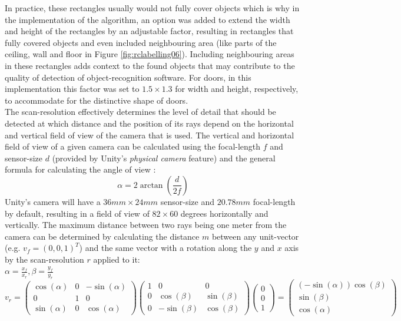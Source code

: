 In practice, these rectangles usually would not fully cover objects which is why in the implementation of the algorithm, an option was added to extend the width and height of the rectangles by an adjustable factor, resulting in rectangles that fully covered objects and even included neighbouring area (like parts of the ceiling, wall and floor in Figure \ref{fig:rclabelling06}). Including neighbouring areas in these rectangles adds context to the found objects that may contribute to the quality of detection of object-recognition software. For doors, in this implementation this factor was set to $1.5 \times 1.3$ for width and height, respectively, to accommodate for the distinctive shape of doors.\\
The scan-resolution effectively determines the level of detail that should be detected at which distance and the position of its rays depend on the horizontal and vertical field of view of the camera that is used. The vertical and horizontal field of view of a given camera can be calculated using the focal-length $f$ and sensor-size $d$ (provided by Unity's \textit{physical camera} feature) and the general formula for calculating the angle of view \cite{WikipediaAngleOfView}:
\[\alpha = 2 \arctan(\frac{d}{2f})\]
Unity's camera will have a $36mm \times 24mm$ sensor-size and $20.78mm$ focal-length by default, resulting in a field of view of $82 \times 60$ degrees horizontally and vertically. The maximum distance between two rays being one meter from the camera can be determined by calculating the distance $m$ between any unit-vector (e.g. $v_f = (0, 0, 1)^T$) and the same vector with a rotation along the $y$ and $x$ axis by the scan-resolution $r$ applied to it:\\
$\alpha = \frac{x_f}{x_r}, \beta = \frac{y_f}{y_r}$\\
$v_r = \begin{pmatrix}\cos(\alpha) & 0 & -\sin(\alpha) \\ 0 & 1 & 0 \\ \sin(\alpha) & 0 & \cos(\alpha)\end{pmatrix}
\begin{pmatrix}1 & 0 & 0 \\ 0 & \cos(\beta) & \sin(\beta) \\ 0 & -\sin(\beta) & \cos(\beta)\end{pmatrix} \begin{pmatrix}0 \\ 0 \\ 1\end{pmatrix} = \begin{pmatrix}(-\sin(\alpha)) \cos(\beta) \\ \sin(\beta) \\ \cos(\alpha)\end{pmatrix}$\\
